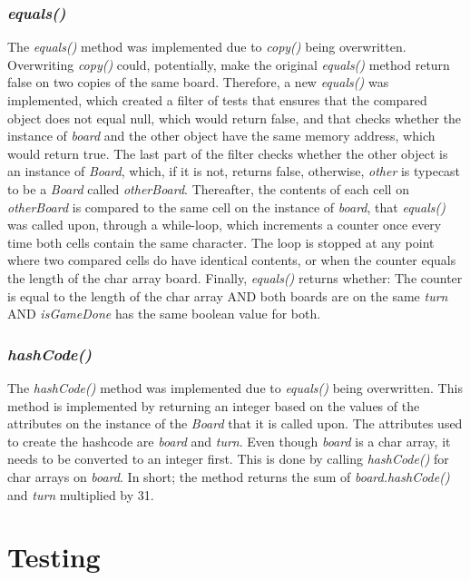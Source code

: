 \documentclass[12pt, a4paper]{article}
\begin{document}
\subsubsection{\emph{equals()}}
The \emph{equals()} method was implemented due to \emph{copy()} being overwritten. Overwriting \emph{copy()} could, potentially, make the original \emph{equals()} method return false on two copies of the same board. Therefore, a new \emph{equals()} was implemented, which created a filter of tests that ensures that the compared object does not equal null, which would return false, and that checks whether the instance of \emph{board} and the other object have the same memory address, which would return true. The last part of the filter checks whether the other object is an instance of \emph{Board}, which, if it is not, returns false, otherwise, \emph{other} is typecast to be a \emph{Board} called \emph{otherBoard}. Thereafter, the contents of each cell on \emph{otherBoard} is compared to the same cell on the instance of \emph{board}, that \emph{equals()} was called upon, through a while-loop, which increments a counter once every time both cells contain the same character. The loop is stopped at any point where two compared cells do have identical contents, or when the counter equals the length of the char array board. Finally, \emph{equals()} returns whether: The counter is equal to the length of the char array AND both boards are on the same \emph{turn} AND \emph{isGameDone} has the same boolean value for both.

\newpage

\subsubsection{\emph{hashCode()}}
The \emph{hashCode()} method was implemented due to \emph{equals()} being overwritten. This method is implemented by returning an integer based on the values of the attributes on the instance of the \emph{Board} that it is called upon. The attributes used to create the hashcode are \emph{board} and \emph{turn}. Even though \emph{board} is a char array, it needs to be converted to an integer first. This is done by calling \emph{hashCode()} for char arrays on \emph{board}. In short; the method returns the sum of \emph{board.hashCode()} and \emph{turn} multiplied by 31.

\newpage

\section{Testing}
\end{document}
